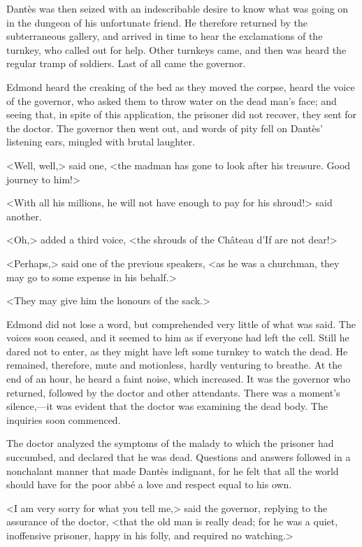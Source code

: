  Dantès was then seized with an indescribable desire to know what was going on in the dungeon of his unfortunate friend. He therefore returned by the subterraneous gallery, and arrived in time to hear the exclamations of the turnkey, who called out for help. Other turnkeys came, and then was heard the regular tramp of soldiers. Last of all came the governor. 

 Edmond heard the creaking of the bed as they moved the corpse, heard the voice of the governor, who asked them to throw water on the dead man's face; and seeing that, in spite of this application, the prisoner did not recover, they sent for the doctor. The governor then went out, and words of pity fell on Dantès' listening ears, mingled with brutal laughter. 

 <Well, well,> said one, <the madman has gone to look after his treasure. Good journey to him!> 

 <With all his millions, he will not have enough to pay for his shroud!> said another. 

 <Oh,> added a third voice, <the shrouds of the Château d'If are not dear!>

<Perhaps,> said one of the previous speakers, <as he was a churchman, they may go to some expense in his behalf.> 

 <They may give him the honours of the sack.> 

 Edmond did not lose a word, but comprehended very little of what was said. The voices soon ceased, and it seemed to him as if everyone had left the cell. Still he dared not to enter, as they might have left some turnkey to watch the dead. He remained, therefore, mute and motionless, hardly venturing to breathe. At the end of an hour, he heard a faint noise, which increased. It was the governor who returned, followed by the doctor and other attendants. There was a moment's silence,—it was evident that the doctor was examining the dead body. The inquiries soon commenced. 

 The doctor analyzed the symptoms of the malady to which the prisoner had succumbed, and declared that he was dead. Questions and answers followed in a nonchalant manner that made Dantès indignant, for he felt that all the world should have for the poor abbé a love and respect equal to his own. 

 <I am very sorry for what you tell me,> said the governor, replying to the assurance of the doctor, <that the old man is really dead; for he was a quiet, inoffensive prisoner, happy in his folly, and required no watching.> 

